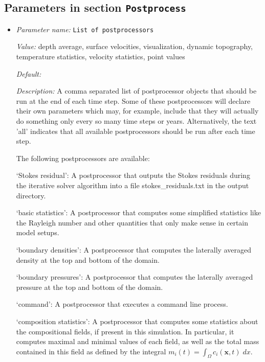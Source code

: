 \subsection{Parameters in section \tt Postprocess}
\label{parameters:Postprocess}

\begin{itemize}
\item {\it Parameter name:} {\tt List of postprocessors}
\label{parameters:Postprocess/List of postprocessors}


{\it Value:} depth average, surface velocities, visualization, dynamic topography, temperature statistics, velocity statistics, point values


{\it Default:} 


{\it Description:} A comma separated list of postprocessor objects that should be run at the end of each time step. Some of these postprocessors will declare their own parameters which may, for example, include that they will actually do something only every so many time steps or years. Alternatively, the text 'all' indicates that all available postprocessors should be run after each time step.

The following postprocessors are available:

`Stokes residual': A postprocessor that outputs the Stokes residuals during the iterative solver algorithm into a file stokes_residuals.txt in the output directory.

`basic statistics': A postprocessor that computes some simplified statistics like the Rayleigh number and other quantities that only make sense in certain model setups.

`boundary densities': A postprocessor that computes the laterally averaged density at the top and bottom of the domain.

`boundary pressures': A postprocessor that computes the laterally averaged pressure at the top and bottom of the domain.

`command': A postprocessor that executes a command line process.

`composition statistics': A postprocessor that computes some statistics about the compositional fields, if present in this simulation. In particular, it computes maximal and minimal values of each field, as well as the total mass contained in this field as defined by the integral $m_i(t) = \int_\Omega c_i(\mathbf x,t) \; dx$.


\end{itemize}
